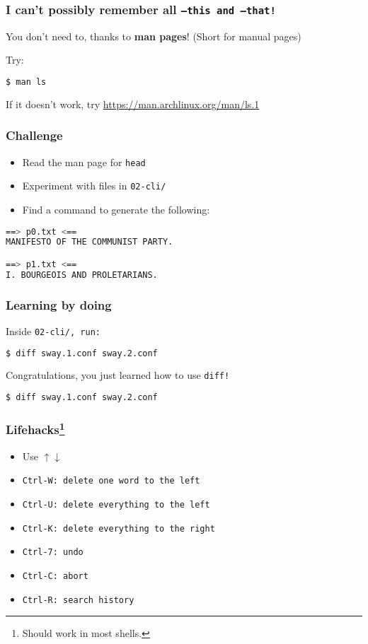\begin{frame}[fragile]
\frametitle{I can't possibly remember all \tt{--this} and \tt{--that}!}
You don't need to, thanks to \textbf{man pages}! (Short for manual pages)

Try:
\begin{lstlisting}[language=bash]
$ man ls
\end{lstlisting}

If it doesn't work, try \url{https://man.archlinux.org/man/ls.1}
\end{frame}

\begin{frame}[fragile]
\frametitle{Challenge}
\begin{itemize}
    \item Read the man page for \tt{head}
    \item Experiment with files in \tt{02-cli/}
    \item Find a command to generate the following:
\end{itemize}
\begin{lstlisting}[language=bash]
==> p0.txt <==
MANIFESTO OF THE COMMUNIST PARTY.

==> p1.txt <==
I. BOURGEOIS AND PROLETARIANS.
\end{lstlisting}
\end{frame}

\begin{frame}[fragile]
\frametitle{Learning by doing}
Inside \tt{02-cli/}, run:
\begin{lstlisting}[language=bash]
$ diff sway.1.conf sway.2.conf
\end{lstlisting}
Congratulations, you just learned how to use \tt{diff}!
\newline \newline
\begin{lstlisting}[language=bash]
$ diff sway.1.conf sway.2.conf
\end{lstlisting}
\end{frame}

\begin{frame}
\frametitle{Lifehacks\footnote{Should work in most shells.}}
\begin{itemize}
    \item Use $\uparrow \downarrow$
    \item \tt{Ctrl-W}: delete one word to the left
    \item \tt{Ctrl-U}: delete everything to the left
    \item \tt{Ctrl-K}: delete everything to the right
    \item \tt{Ctrl-7}: undo
    \item \tt{Ctrl-C}: abort
    \item \tt{Ctrl-R}: search history
\end{itemize}
\end{frame}

